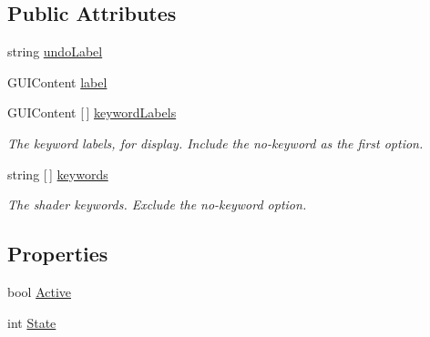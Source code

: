 \subsection*{Public Attributes}
\begin{DoxyCompactItemize}
\item 
string \mbox{\hyperlink{class_t_m_pro_1_1_editor_utilities_1_1_t_m_p___base_shader_g_u_i_1_1_shader_feature_a470a351a75533f49366cae612b2d64eb}{undo\+Label}}
\item 
G\+U\+I\+Content \mbox{\hyperlink{class_t_m_pro_1_1_editor_utilities_1_1_t_m_p___base_shader_g_u_i_1_1_shader_feature_a2f1b03dae7728b6db40d10b338fe7385}{label}}
\item 
G\+U\+I\+Content \mbox{[}$\,$\mbox{]} \mbox{\hyperlink{class_t_m_pro_1_1_editor_utilities_1_1_t_m_p___base_shader_g_u_i_1_1_shader_feature_a299154d3061dfbd825b081811e294ec8}{keyword\+Labels}}
\begin{DoxyCompactList}\small\item\em The keyword labels, for display. Include the no-\/keyword as the first option. \end{DoxyCompactList}\item 
string \mbox{[}$\,$\mbox{]} \mbox{\hyperlink{class_t_m_pro_1_1_editor_utilities_1_1_t_m_p___base_shader_g_u_i_1_1_shader_feature_a2b631a750e65c693953dc1d68799e074}{keywords}}
\begin{DoxyCompactList}\small\item\em The shader keywords. Exclude the no-\/keyword option. \end{DoxyCompactList}\end{DoxyCompactItemize}
\subsection*{Properties}
\begin{DoxyCompactItemize}
\item 
bool \mbox{\hyperlink{class_t_m_pro_1_1_editor_utilities_1_1_t_m_p___base_shader_g_u_i_1_1_shader_feature_a04247ec2161bb6a953fe1cda8054f44c}{Active}}
\item 
int \mbox{\hyperlink{class_t_m_pro_1_1_editor_utilities_1_1_t_m_p___base_shader_g_u_i_1_1_shader_feature_a65e226786c61edeb3d07814d02042632}{State}}
\end{DoxyCompactItemize}


